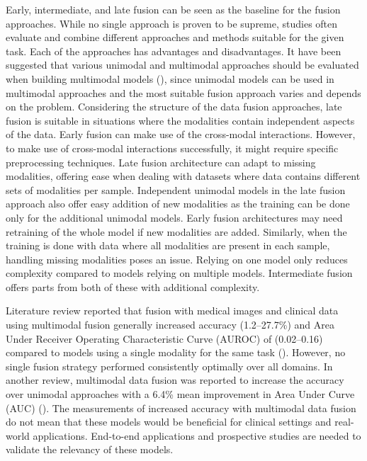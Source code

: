 Early, intermediate, and late fusion can be seen as the baseline for the fusion approaches. While no single approach is proven to be supreme, studies often evaluate and combine different approaches and methods suitable for the given task.
Each of the approaches has advantages and disadvantages. It have been suggested that various unimodal and multimodal approaches should be evaluated when building multimodal models (\cite{article22}), since unimodal models can be used in multimodal approaches and the most suitable fusion approach varies and depends on the problem. Considering the structure of the data fusion approaches, late fusion is suitable in situations where the modalities contain independent aspects of the data. Early fusion can make use of the cross-modal interactions. However, to make use of cross-modal interactions successfully, it might require specific preprocessing techniques. Late fusion architecture can adapt to missing modalities, offering ease when dealing with datasets where data contains different sets of modalities per sample. Independent unimodal models in the late fusion approach also offer easy addition of new modalities as the training can be done only for the additional unimodal models. Early fusion architectures may need retraining of the whole model if new modalities are added. Similarly, when the training is done with data where all modalities are present in each sample, handling missing modalities poses an issue. Relying on one model only reduces complexity compared to models relying on multiple models. Intermediate fusion offers parts from both of these with additional complexity.

Literature review reported that fusion with medical images and clinical data using multimodal fusion generally increased accuracy (1.2–27.7\%) and  Area Under Receiver Operating Characteristic Curve (AUROC\footnotemark{}) of (0.02–0.16) compared to models using a single modality for the same task (\cite{article22}). However, no single fusion strategy performed consistently optimally over all domains. In another review, multimodal data fusion was reported to increase the accuracy over unimodal approaches with a 6.4\% mean improvement in Area Under Curve (AUC\footnotemark[\value{footnote}]) (\cite{articlePreciRev}). The measurements of increased accuracy with multimodal data fusion do not mean that these models would be beneficial for clinical settings and real-world applications. End-to-end applications and prospective studies are needed to validate the relevancy of these models.

